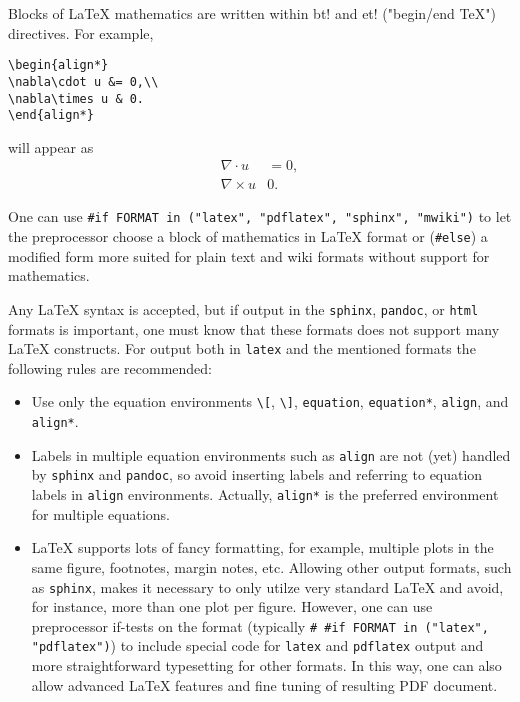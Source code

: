 \documentclass[twoside]{article}
\begin{document}
Blocks of {\LaTeX} mathematics are written within
{\fontsize{10pt}{10pt}\verb!!bt!}
and
{\fontsize{10pt}{10pt}\verb!!et!} ("begin/end TeX") directives.
For example,
\begin{Verbatim}
\begin{align*}
\nabla\cdot u &= 0,\\
\nabla\times u & 0.
\end{align*}
\end{Verbatim}
will appear as
\begin{align*}
\nabla\cdot u &= 0,\\
\nabla\times u & 0.
\end{align*}

One can use {\fontsize{10pt}{10pt}\verb!#if FORMAT in ("latex", "pdflatex", "sphinx", "mwiki")!} to let
the preprocessor choose a block of mathematics in {\LaTeX} format
or ({\fontsize{10pt}{10pt}\verb!#else!}) a modified form more suited for plain text and wiki
formats without support for mathematics.

Any {\LaTeX} syntax is accepted, but if output in the {\fontsize{10pt}{10pt}\verb!sphinx!}, {\fontsize{10pt}{10pt}\verb!pandoc!},
or {\fontsize{10pt}{10pt}\verb!html!} formats
is important, one must know that these formats does not support many
{\LaTeX} constructs. For output both in {\fontsize{10pt}{10pt}\verb!latex!} and the mentioned formats
the following rules are recommended:

\begin{itemize}
  \item Use only the equation environments {\fontsize{10pt}{10pt}\verb!\[!}, {\fontsize{10pt}{10pt}\verb!\]!},
    {\fontsize{10pt}{10pt}\verb!equation!}, {\fontsize{10pt}{10pt}\verb!equation*!}, {\fontsize{10pt}{10pt}\verb!align!}, and {\fontsize{10pt}{10pt}\verb!align*!}.

  \item Labels in multiple equation environments such as {\fontsize{10pt}{10pt}\verb!align!} are
    not (yet) handled by {\fontsize{10pt}{10pt}\verb!sphinx!} and {\fontsize{10pt}{10pt}\verb!pandoc!}, so avoid inserting
    labels and referring  to equation labels in {\fontsize{10pt}{10pt}\verb!align!} environments.
    Actually, {\fontsize{10pt}{10pt}\verb!align*!} is the preferred environment for multiple equations.

  \item {\LaTeX} supports lots of fancy formatting, for example, multiple
    plots in the same figure, footnotes, margin notes, etc.
    Allowing other output formats, such as {\fontsize{10pt}{10pt}\verb!sphinx!}, makes it necessary
    to only utilze very standard {\LaTeX} and avoid, for instance, more than
    one plot per figure. However, one can use preprocessor if-tests on
    the format (typically {\fontsize{10pt}{10pt}\verb!# #if FORMAT in ("latex", "pdflatex")!}) to
    include special code for {\fontsize{10pt}{10pt}\verb!latex!} and {\fontsize{10pt}{10pt}\verb!pdflatex!} output and more
    straightforward typesetting for other formats. In this way, one can
    also allow advanced {\LaTeX} features and fine tuning of resulting
    PDF document.
\end{itemize}
\end{document}

